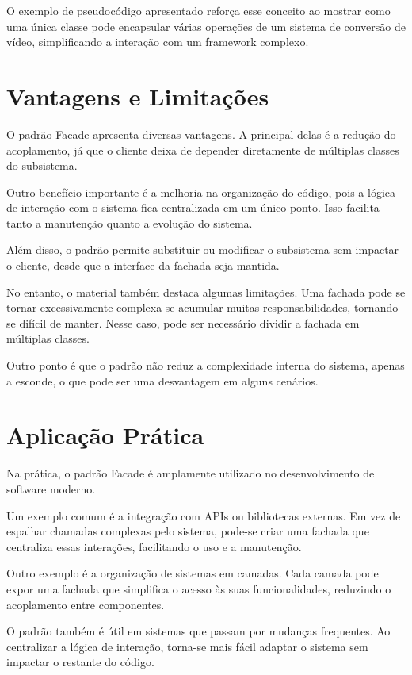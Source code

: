 \documentclass[conference]{IEEEtran}
\begin{document}
O exemplo de pseudocódigo apresentado reforça esse conceito ao mostrar como uma única classe pode encapsular várias operações de um sistema de conversão de vídeo, simplificando a interação com um framework complexo.

\section{Vantagens e Limitações}

O padrão Facade apresenta diversas vantagens. A principal delas é a redução do acoplamento, já que o cliente deixa de depender diretamente de múltiplas classes do subsistema.

Outro benefício importante é a melhoria na organização do código, pois a lógica de interação com o sistema fica centralizada em um único ponto. Isso facilita tanto a manutenção quanto a evolução do sistema.

Além disso, o padrão permite substituir ou modificar o subsistema sem impactar o cliente, desde que a interface da fachada seja mantida.

No entanto, o material também destaca algumas limitações. Uma fachada pode se tornar excessivamente complexa se acumular muitas responsabilidades, tornando-se difícil de manter. Nesse caso, pode ser necessário dividir a fachada em múltiplas classes.

Outro ponto é que o padrão não reduz a complexidade interna do sistema, apenas a esconde, o que pode ser uma desvantagem em alguns cenários.

\section{Aplicação Prática}

Na prática, o padrão Facade é amplamente utilizado no desenvolvimento de software moderno.

Um exemplo comum é a integração com APIs ou bibliotecas externas. Em vez de espalhar chamadas complexas pelo sistema, pode-se criar uma fachada que centraliza essas interações, facilitando o uso e a manutenção.

Outro exemplo é a organização de sistemas em camadas. Cada camada pode expor uma fachada que simplifica o acesso às suas funcionalidades, reduzindo o acoplamento entre componentes.

O padrão também é útil em sistemas que passam por mudanças frequentes. Ao centralizar a lógica de interação, torna-se mais fácil adaptar o sistema sem impactar o restante do código.
\end{document}
